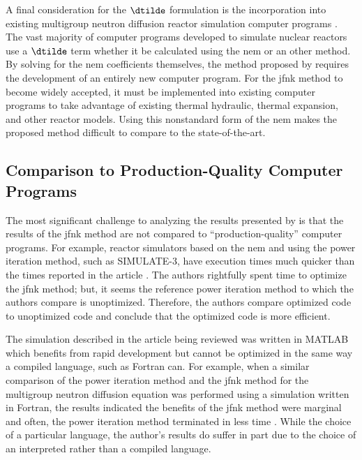     A final consideration for the $\dtilde$ formulation is the incorporation
    into existing multigroup neutron diffusion reactor simulation computer
    programs \cite{casmo4,simulate3,mpact}. The vast majority of computer
    programs developed to simulate nuclear reactors use a $\dtilde$ term whether
    it be calculated using the \gls{nem} or an other method. By solving for the
    \gls{nem} coefficients themselves, the method proposed by
    \citeauthor{qe2paper} requires the development of an entirely new computer
    program. For the \gls{jfnk} method to become widely accepted, it must be
    implemented into existing computer programs to take advantage of existing
    thermal hydraulic, thermal expansion, and other reactor models. Using this
    nonstandard form of the \gls{nem} makes the proposed method difficult to
    compare to the state-of-the-art.

  \subsection{Comparison to Production-Quality Computer Programs}
    The most significant challenge to analyzing the results presented by
    \citeauthor{qe2paper} is that the results of the \gls{jfnk} method are not
    compared to ``production-quality'' computer programs. For example, reactor
    simulators based on the \gls{nem} and using the power iteration method, such
    as SIMULATE-3, have execution times much quicker than the times reported in
    the article \cite{simulate3,qe2paper}. The authors rightfully spent time to
    optimize the \gls{jfnk} method; but, it seems the reference power iteration
    method to which the authors compare is unoptimized. Therefore, the authors
    compare optimized code to unoptimized code and conclude that the optimized
    code is more efficient.
    
    The simulation described in the article being reviewed was written in MATLAB
    which benefits from rapid development but cannot be optimized in the same
    way a compiled language, such as Fortran can. For example, when a similar
    comparison of the power iteration method and the \gls{jfnk} method for the
    multigroup neutron diffusion equation was performed using a simulation
    written in Fortran, the results indicated the benefits of the \gls{jfnk}
    method were marginal and often, the power iteration method terminated in
    less time \cite{gill_azmy}. While the choice of a particular language, the
    author's results do suffer in part due to the choice of an interpreted
    rather than a compiled language.

